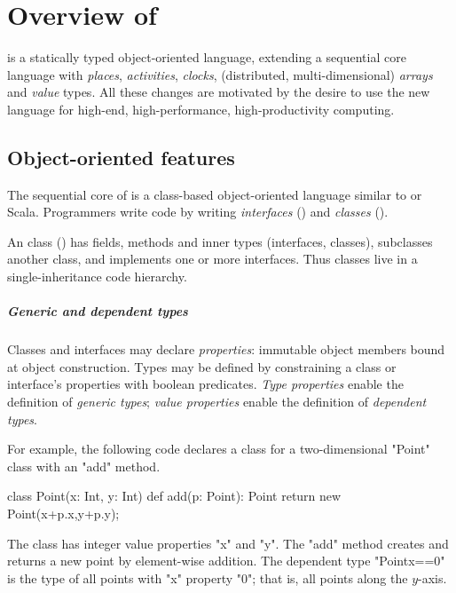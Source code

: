 \chapter{Overview of \Xten}

\Xten{} is a statically typed object-oriented language, extending a
sequential core language with 
\emph{places},
\emph{activities}, \emph{clocks},
(distributed, multi-dimensional) \emph{arrays} and \emph{value}
types. All these changes are motivated by the desire to use the new
language for high-end, high-performance, high-productivity computing.

\section{Object-oriented features}

The sequential core of \Xten{} is a class-based object-oriented language
similar to \java{} or Scala.
Programmers write \Xten{} code by writing \emph{interfaces}
() and \emph{classes}
().

An \Xten{} class () has fields, methods and
inner types (interfaces, classes), subclasses another class, and
implements one or more interfaces. Thus \Xten{} classes live in a
single-inheritance code hierarchy.

\paragraph{Generic and dependent types}
Classes and interfaces may declare \emph{properties}: immutable object members bound at object construction.
Types may be defined by constraining a
class or interface's properties with boolean predicates.
\emph{Type properties} enable the definition of \emph{generic types};
\emph{value properties} enable the definition of \emph{dependent types}.

For example, the following code declares a class for a two-dimensional 
\xcd"Point" class with an \xcd"add" method.
\begin{xten}
class Point(x: Int, y: Int) {
    def add(p: Point): Point { return new Point(x+p.x,y+p.y); }
}
\end{xten}
The class has integer value properties \xcd"x" and \xcd"y".
The \xcd"add" method creates and returns a new point by
element-wise addition.
The dependent type \xcd"Point{x==0}" is the type of all points 
with \xcd"x" property \xcd"0"; that is, all points along the $y$-axis.

